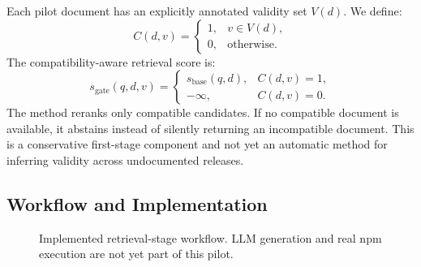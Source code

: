 \documentclass[conference]{IEEEtran}
\begin{document}
Each pilot document has an explicitly annotated validity set $V(d)$. We define:
\begin{equation}
C(d,v)=\begin{cases}1,&v\in V(d),\\0,&\text{otherwise}.\end{cases}
\end{equation}
The compatibility-aware retrieval score is:
\begin{equation}
s_{\mathrm{gate}}(q,d,v)=
\begin{cases}
s_{\mathrm{base}}(q,d),&C(d,v)=1,\\
-\infty,&C(d,v)=0.
\end{cases}
\end{equation}
The method reranks only compatible candidates. If no compatible document is available, it abstains instead of silently returning an incompatible document. This is a conservative first-stage component and not yet an automatic method for inferring validity across undocumented releases.

\subsection{Workflow and Implementation}
\begin{figure}[t]
\centering
{}
\caption{Implemented retrieval-stage workflow. LLM generation and real npm execution are not yet part of this pilot.}
\label{fig:workflow}
\end{figure}
\end{document}
